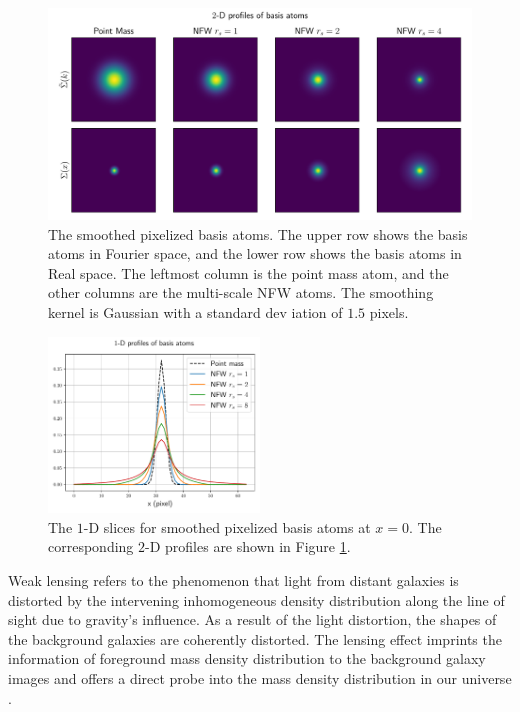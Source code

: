 \documentclass[twocolumn]{aastex62}
\begin{document}
\begin{figure}[!t] \includegraphics[width=1.\textwidth]{nfwlet-atom-2D.pdf}
    \caption{The smoothed pixelized basis atoms. The upper row shows the basis
        atoms in Fourier space, and the lower row shows the basis atoms in Real
        space.  The leftmost column is the point mass atom, and the other
        columns are the multi-scale NFW atoms.  The smoothing kernel is
        Gaussian with a standard dev
        iation of $1.5$ pixels.
        } \label{fig-atoms2D}
\end{figure}

\begin{figure}
 \includegraphics[width=0.5\textwidth]{nfwlet-atom-1D.pdf}
    \caption{The $1$-D slices for smoothed pixelized basis atoms at $x=0$. The
        corresponding $2$-D profiles are shown in Figure \ref{fig-atoms2D}.
        }
 \label{fig-atoms1D}
\end{figure}

Weak lensing refers to the phenomenon that light from distant galaxies is
distorted by the intervening inhomogeneous density distribution along the line
of sight due to gravity's influence.
As a result of the light distortion, the shapes of the background galaxies are
coherently distorted. The lensing effect imprints the information of
foreground mass density distribution to the background galaxy images and offers
a direct probe into the mass density distribution in our universe
\citep[see][for recent reviews]{revKilbinger15,revRachel17}.
\end{document}
